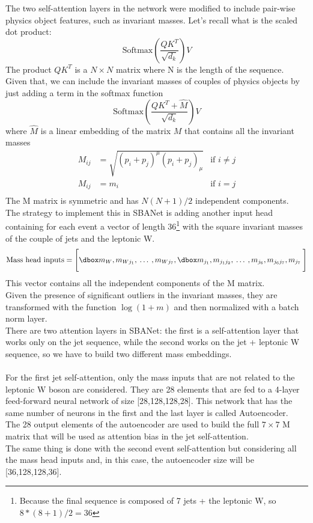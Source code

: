 The two self-attention layers in the network were modified to include pair-wise physics object features, such as invariant masses.
Let's recall what is the scaled dot product:
\begin{equation}
    \text{Softmax}\left( \frac{QK^T}{\sqrt{d_k}} \right)V
\end{equation}
The product $QK^T$ is a $N\times N$ matrix where N is the length of the sequence.\\
Given that, we can include the invariant masses of couples of physics objects by just adding a term in the softmax function
\begin{equation}
    \text{Softmax}\left( \frac{QK^T+\hat{M}}{\sqrt{d_k}} \right)V
\end{equation}
where $\hat{M}$ is a linear embedding of the matrix $M$ that contains all the invariant masses
\begin{equation}
\begin{aligned}
    M_{ij}&=\sqrt{(p_i+p_j)^\mu(p_i+p_j)_\mu} & \text{if } i\neq j\\
    M_{ij}&=m_i & \text{if } i=j\\
\end{aligned}
\end{equation}
The M matrix is symmetric and has $N(N+1)/2$ independent components.\\
The strategy to implement this in SBANet is adding another input head containing for each event a vector of length 36\footnote{Because the final sequence is composed of 7 jets + the leptonic W, so $8*(8+1)/2=36$} with the square invariant masses of the couple of jets and the leptonic W.
\begin{equation*}
    \text{Mass head inputs}=\Biggl[ \dboxed{m_W,m_{Wj_1},\:\dots\:,m_{Wj_7},\dboxed{m_{j_1},m_{j_1 j_2},\:\dots\:,m_{j_6},m_{j_6 j_7},m_{j_7}}}\: \Biggr]
\end{equation*}
This vector contains all the independent components of the M matrix.\\
Given the presence of significant outliers in the invariant masses, they are transformed with the function $\log(1+m)$ and then normalized with a batch norm layer.\\
There are two attention layers in SBANet: the first is a self-attention layer that works only on the jet sequence, while the second works on the jet + leptonic W sequence, so we have to build two different mass embeddings.\\
\\
For the first jet self-attention, only the mass inputs that are not related to the leptonic W boson are considered. They are 28 elements that are fed to a 4-layer feed-forward neural network of size [28,128,128,28]. This network that has the same number of neurons in the first and the last layer is called Autoencoder.\\
The 28 output elements of the autoencoder are used to build the full $7\times 7$ M matrix that will be used as attention bias in the jet self-attention.\\
The same thing is done with the second event self-attention but considering all the mass head inputs and, in this case, the autoencoder size will be [36,128,128,36].\\

